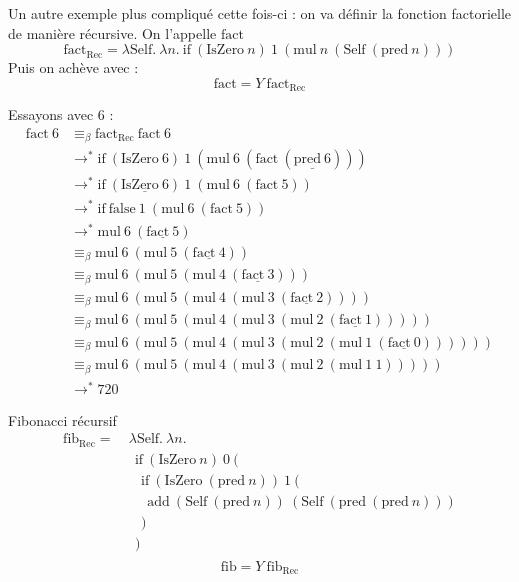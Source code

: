 \documentclass[11pt]{article}
\begin{document}
\begin{example}
    Un autre exemple plus compliqué cette fois-ci : on va définir la fonction factorielle de manière récursive. On l'appelle $\text{fact}$
    $$\text{fact}_\text{Rec} = \lambda \text{Self}.~\lambda n.~\text{if}~(\text{IsZero}~n)~1~(\text{mul}~n~(\text{Self}~(\text{pred}~n)))$$
    Puis on achève avec :
    $$\text{fact} = Y~\text{fact}_\text{Rec}$$
    
    Essayons avec 6 :
    \begin{equation*}
    \begin{aligned}
        \text{fact}~6&\equiv_\beta \text{fact}_\text{Rec}~\text{fact}~6\\
        &\longrightarrow^* \text{if}~(\text{IsZero}~6)~1~(\text{mul}~6~(\text{fact}~(\underline{\text{pred}~6})))\\
        &\longrightarrow^* \text{if}~(\underline{\text{IsZero}~6})~1~(\text{mul}~6~(\text{fact}~5))\\
        &\longrightarrow^* \text{if}~\text{false}~1~(\text{mul}~6~(\text{fact}~5))\\
        &\longrightarrow^* \text{mul}~6~(\underline{\text{fact}~5})\\
        &\equiv_\beta \text{mul}~6~(\text{mul}~5~(\underline{\text{fact}~4}))\\
        &\equiv_\beta \text{mul}~6~(\text{mul}~5~(\text{mul}~4~(\underline{\text{fact}~3})))\\
        &\equiv_\beta \text{mul}~6~(\text{mul}~5~(\text{mul}~4~(\text{mul}~3~(\underline{\text{fact}~2}))))\\
        &\equiv_\beta \text{mul}~6~(\text{mul}~5~(\text{mul}~4~(\text{mul}~3~(\text{mul}~2~(\underline{\text{fact}~1})))))\\
        &\equiv_\beta \text{mul}~6~(\text{mul}~5~(\text{mul}~4~(\text{mul}~3~(\text{mul}~2~(\text{mul}~1~(\underline{\text{fact}~0}))))))\\
        &\equiv_\beta \text{mul}~6~(\text{mul}~5~(\text{mul}~4~(\text{mul}~3~(\text{mul}~2~(\text{mul}~1~1)))))\\
        &\longrightarrow^* 720
    \end{aligned}
    \end{equation*}
\end{example}

\begin{example}
    Fibonacci récursif
    \begin{equation*}
    \begin{aligned}
        \text{fib}_\text{Rec} =~& \lambda \text{Self}.~\lambda{n}.\\
        &~~\text{if}~(\text{IsZero}~n)~0~(\\
        &~~~~\text{if}~(\text{IsZero}~(\text{pred}~n))~1~(\\
        &~~~~~~\text{add}~(\text{Self}~(\text{pred}~n))~(\text{Self}~(\text{pred}~(\text{pred}~n)))\\
        &~~~~)\\
        &~~)\\
    \end{aligned}
    \end{equation*}
    $$\text{fib} = Y~\text{fib}_\text{Rec}$$
\end{example}
\end{document}

